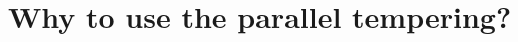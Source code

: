 \documentclass[xetex]{beamer}
\begin{document}



	\section[Why bother?]{Why to use the parallel tempering?}
	

\end{document}
